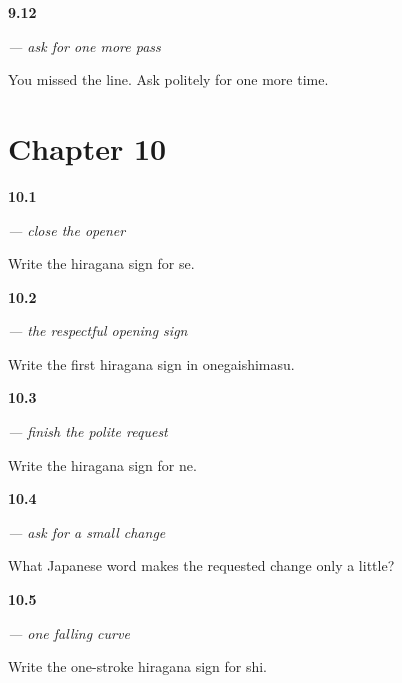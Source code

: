 \noindent\begin{minipage}[t]{\linewidth}
\raggedright
\hypertarget{review-JA-C09-mou-ichido-onegaishimasu-request}{\textbf{9.12}} \emph{ — ask for one more pass}\par
\small You missed the line. Ask politely for one more time.
\end{minipage}\par\medskip

\section*{Chapter 10}

\noindent\begin{minipage}[t]{\linewidth}
\raggedright
\hypertarget{review-JA-W10-se-write}{\textbf{10.1}} \emph{ — close the opener}\par
\small Write the hiragana sign for se.
\end{minipage}\par\medskip

\noindent\begin{minipage}[t]{\linewidth}
\raggedright
\hypertarget{review-JA-W10-o-first}{\textbf{10.2}} \emph{ — the respectful opening sign}\par
\small Write the first hiragana sign in onegaishimasu.
\end{minipage}\par\medskip

\noindent\begin{minipage}[t]{\linewidth}
\raggedright
\hypertarget{review-JA-W10-ne-write}{\textbf{10.3}} \emph{ — finish the polite request}\par
\small Write the hiragana sign for ne.
\end{minipage}\par\medskip

\noindent\begin{minipage}[t]{\linewidth}
\raggedright
\hypertarget{review-JA-C10-sukoshi-meaning}{\textbf{10.4}} \emph{ — ask for a small change}\par
\small What Japanese word makes the requested change only a little?
\end{minipage}\par\medskip

\noindent\begin{minipage}[t]{\linewidth}
\raggedright
\hypertarget{review-JA-W10-shi-write}{\textbf{10.5}} \emph{ — one falling curve}\par
\small Write the one-stroke hiragana sign for shi.
\end{minipage}\par\medskip


